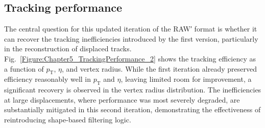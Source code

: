 \subsection{Tracking performance}

The central question for this updated iteration of the RAW′ format is whether it can recover the tracking inefficiencies introduced by the first version, particularly in the reconstruction of displaced tracks. Fig.~\ref{Figure:Chapter5_TrackingPerformance_2} shows the tracking efficiency as a function of $p_\mathrm{T}$, $\eta$, and vertex radius. While the first iteration already preserved efficiency reasonably well in $p_\mathrm{T}$ and $\eta$, leaving limited room for improvement, a significant recovery is observed in the vertex radius distribution. The inefficiencies at large displacements, where performance was most severely degraded, are substantially mitigated in this second iteration, demonstrating the effectiveness of reintroducing shape-based filtering logic.

